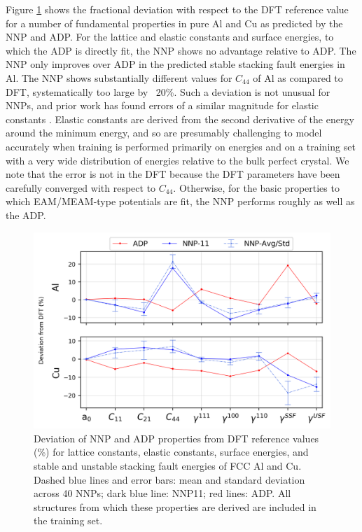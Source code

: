 \documentclass{article}
\begin{document}
Figure \ref{fig:matparam_purestats} shows the fractional deviation with respect to the DFT reference value for a number of fundamental properties in pure Al and Cu as predicted by the NNP and ADP.  For the lattice and elastic constants and surface energies, to which the ADP is directly fit, the NNP shows no advantage relative to ADP. The NNP only improves over ADP in the predicted stable stacking fault energies in Al.
The NNP shows substantially different values for $C_{44}$ of Al as compared to DFT, systematically too large by ~20\%.  Such a deviation is not unusual for NNPs, and prior work has found errors of a similar magnitude for elastic constants \cite{Zuo2020APotentials}.
Elastic constants are derived from the second derivative of the energy around the minimum energy, and so are presumably challenging to model accurately
when training is performed primarily on energies and on a training set with a very wide distribution of energies relative to the bulk perfect crystal.  
We note that the error is not in the DFT because the DFT parameters have been carefully converged with respect to $C_{44}$.  Otherwise, for the basic properties to which EAM/MEAM-type potentials are fit, the NNP performs roughly as well as the ADP.

\begin{figure}[H]%
\centering%
\includegraphics[width=1\textwidth,center]{./figures/matparam_purestats.png}%
\caption{Deviation of NNP and ADP properties from DFT reference values (\%) for lattice constants, elastic constants, surface energies, and stable and unstable stacking fault energies of FCC Al and Cu.  Dashed blue lines and error bars: mean and standard deviation across 40 NNPs; dark blue line: NNP11; red lines: ADP.  
All structures from which these properties are derived are included in the training set. }%
\label{fig:matparam_purestats}
\end{figure}
\end{document}
